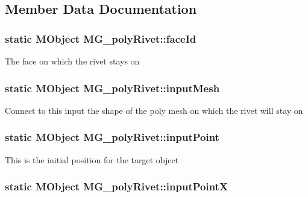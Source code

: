 \subsection{Member Data Documentation}
\hypertarget{class_m_g__poly_rivet_addab0e7cdd6ba7d9580198f19f66dbd0}{
\subsubsection[{face\-Id}]{\setlength{\rightskip}{0pt plus 5cm}static M\-Object M\-G\-\_\-poly\-Rivet\-::face\-Id\hspace{0.3cm}{\ttfamily [static]}}}\label{class_m_g__poly_rivet_addab0e7cdd6ba7d9580198f19f66dbd0}
The face on which the rivet stays on \hypertarget{class_m_g__poly_rivet_a7ab1746e551e796af0a8ded100097d23}{
\subsubsection[{input\-Mesh}]{\setlength{\rightskip}{0pt plus 5cm}static M\-Object M\-G\-\_\-poly\-Rivet\-::input\-Mesh\hspace{0.3cm}{\ttfamily [static]}}}\label{class_m_g__poly_rivet_a7ab1746e551e796af0a8ded100097d23}
Connect to this input the shape of the poly mesh on which the rivet will stay on \hypertarget{class_m_g__poly_rivet_af237dc390876f88e7577aa83457e7ce2}{
\subsubsection[{input\-Point}]{\setlength{\rightskip}{0pt plus 5cm}static M\-Object M\-G\-\_\-poly\-Rivet\-::input\-Point\hspace{0.3cm}{\ttfamily [static]}}}\label{class_m_g__poly_rivet_af237dc390876f88e7577aa83457e7ce2}
This is the initial position for the target object \hypertarget{class_m_g__poly_rivet_a08e43c9e982462593cd8f161f7077f1c}{
\subsubsection[{input\-Point\-X}]{\setlength{\rightskip}{0pt plus 5cm}static M\-Object M\-G\-\_\-poly\-Rivet\-::input\-Point\-X\hspace{0.3cm}{\ttfamily [static]}}}\label{class_m_g__poly_rivet_a08e43c9e982462593cd8f161f7077f1c}
